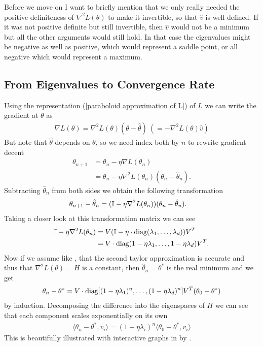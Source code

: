 Before we move on I want to briefly mention that we only really needed the
positive definiteness of \(\nabla^2 L(\theta)\) to make it invertible, so that
\(\hat{v}\) is well defined. If it was not positive definite but still invertible,
then \(\hat{v}\) would not be a minimum but all the other arguments would still
hold.
In that case the eigenvalues might be negative as well as positive, which would
represent a saddle point, or all negative which would represent a maximum.

\subsection{From Eigenvalues to Convergence Rate}

Using the representation (\ref{paraboloid approximation of L}) of \(L\) we
can write the gradient at \(\theta\) as
%
\begin{align*}
	\nabla L(\theta)
	=  \nabla^2 L(\theta)(\theta-\hat{\theta})
	\ (= -\nabla^2 L(\theta)\hat{v})
\end{align*}
%
But note that \(\hat{\theta}\) depends on \(\theta\), so we need index both
by \(n\) to rewrite gradient decent
%
\begin{align*}
	\theta_{n+1} &= \theta_n - \eta\nabla L(\theta_n)\\
	&= \theta_n - \eta\nabla^2 L(\theta_n)(\theta_n - \hat{\theta}_n).
\end{align*}
%
Subtracting \(\hat{\theta}_n\) from both sides we obtain the following
transformation 
%
\begin{align*}
	\theta_{n+1} - \hat{\theta}_n
	&= (\mathbb{I} - \eta\nabla^2 L(\theta_n) ) (\theta_n - \hat{\theta}_n).
\end{align*}
%
Taking a closer look at this transformation matrix we can see
%
\begin{align*}
	\mathbb{I} - \eta\nabla^2 L(\theta_n)
	&= V(\mathbb{I} - \eta\cdot\text{diag}(\lambda_1,\dots,\lambda_d) )V^T \\
	&= V\cdot\text{diag}(1-\eta\lambda_1, \dots,1-\eta\lambda_d)V^T.
\end{align*}
%
Now if we assume like \textcite{gohWhyMomentumReally2017}, that the second
taylor approximation is accurate and thus that \(\nabla^2 L(\theta)=H\) is a
constant, then \(\hat{\theta}_n = \theta^*\) is the real minimum and we get
%
\begin{align}
	\theta_n - \theta^*
	= V\cdot\text{diag}[(1-\eta\lambda_1)^n,\dots,(1-\eta\lambda_d)^n] V^T (\theta_0 - \theta^*)
\end{align}
%
by induction. Decomposing the difference into the eigenspaces of \(H\) we can 
see that each component scales exponentially on its own 
%
\begin{align*}
	\langle \theta_n -\theta^*, v_i\rangle = (1-\eta\lambda_i)^n \langle \theta_0 - \theta^*, v_i\rangle
\end{align*}
%
This is beautifully illustrated with interactive graphs in
 by \citeauthor{gohWhyMomentumReally2017}.


